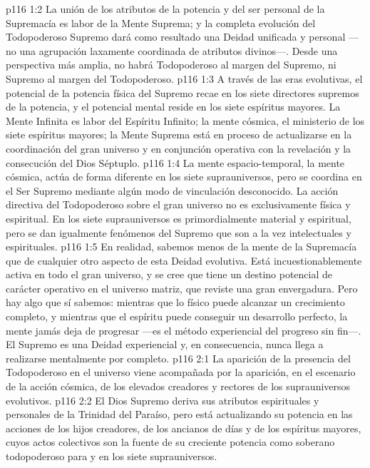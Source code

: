 \vs p116 1:2 La unión de los atributos de la potencia y del ser personal de la Supremacía es labor de la Mente Suprema; y la completa evolución del Todopoderoso Supremo dará como resultado una Deidad unificada y personal ---no una agrupación laxamente coordinada de atributos divinos---. Desde una perspectiva más amplia, no habrá Todopoderoso al margen del Supremo, ni Supremo al margen del Todopoderoso.
\vs p116 1:3 A través de las eras evolutivas, el potencial de la potencia física del Supremo recae en los siete directores supremos de la potencia, y el potencial mental reside en los siete espíritus mayores. La Mente Infinita es labor del Espíritu Infinito; la mente cósmica, el ministerio de los siete espíritus mayores; la Mente Suprema está en proceso de actualizarse en la coordinación del gran universo y en conjunción operativa con la revelación y la consecución del Dios Séptuplo.
\vs p116 1:4 \pc La mente espacio\hyp{}temporal, la mente cósmica, actúa de forma diferente en los siete suprauniversos, pero se coordina en el Ser Supremo mediante algún modo de vinculación desconocido. La acción directiva del Todopoderoso sobre el gran universo no es exclusivamente física y espiritual. En los siete suprauniversos es primordialmente material y espiritual, pero se dan igualmente fenómenos del Supremo que son a la vez intelectuales y espirituales.
\vs p116 1:5 En realidad, sabemos menos de la mente de la Supremacía que de cualquier otro aspecto de esta Deidad evolutiva. Está incuestionablemente activa en todo el gran universo, y se cree que tiene un destino potencial de carácter operativo en el universo matriz, que reviste una gran envergadura. Pero hay algo que sí sabemos: mientras que lo físico puede alcanzar un crecimiento completo, y mientras que el espíritu puede conseguir un desarrollo perfecto, la mente jamás deja de progresar ---es el método experiencial del progreso sin fin---. El Supremo es una Deidad experiencial y, en consecuencia, nunca llega a realizarse mentalmente por completo.
\vs p116 2:1 La aparición de la presencia del Todopoderoso en el universo viene acompañada por la aparición, en el escenario de la acción cósmica, de los elevados creadores y rectores de los suprauniversos evolutivos.
\vs p116 2:2 El Dios Supremo deriva sus atributos espirituales y personales de la Trinidad del Paraíso, pero está actualizando su potencia en las acciones de los hijos creadores, de los ancianos de días y de los espíritus mayores, cuyos actos colectivos son la fuente de su creciente potencia como soberano todopoderoso para y en los siete suprauniversos.
